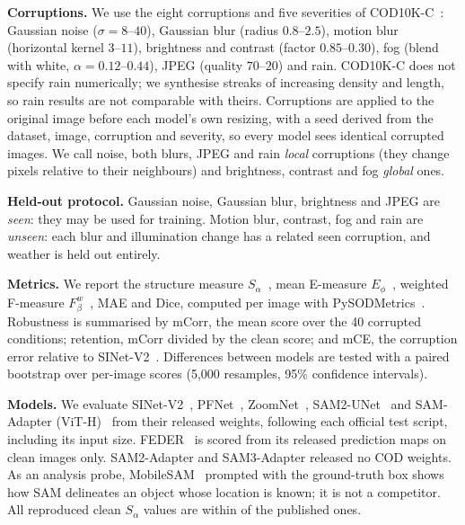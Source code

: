 \documentclass[conference]{IEEEtran}
\newcommand{\Sa}{$S_\alpha$}
\begin{document}
\textbf{Corruptions.} We use the eight corruptions and five severities of COD10K-C~\cite{sayem2026cod10kc}: Gaussian noise ($\sigma=8$--$40$), Gaussian blur (radius $0.8$--$2.5$), motion blur (horizontal kernel $3$--$11$), brightness and contrast (factor $0.85$--$0.30$), fog (blend with white, $\alpha=0.12$--$0.44$), JPEG (quality $70$--$20$) and rain. COD10K-C does not specify rain numerically; we synthesise streaks of increasing density and length, so rain results are not comparable with theirs. Corruptions are applied to the original image before each model's own resizing, with a seed derived from the dataset, image, corruption and severity, so every model sees identical corrupted images. We call noise, both blurs, JPEG and rain \emph{local} corruptions (they change pixels relative to their neighbours) and brightness, contrast and fog \emph{global} ones.

\textbf{Held-out protocol.} Gaussian noise, Gaussian blur, brightness and JPEG are \emph{seen}: they may be used for training. Motion blur, contrast, fog and rain are \emph{unseen}: each blur and illumination change has a related seen corruption, and weather is held out entirely.

\textbf{Metrics.} We report the structure measure \Sa~\cite{fan2017smeasure}, mean E-measure $E_\phi$~\cite{fan2018emeasure}, weighted F-measure $F_\beta^w$~\cite{margolin2014wfm}, MAE and Dice, computed per image with PySODMetrics~\cite{pysodmetrics}. Robustness is summarised by mCorr, the mean score over the 40 corrupted conditions; retention, mCorr divided by the clean score; and mCE, the corruption error relative to SINet-V2~\cite{hendrycks2019imagenetc}. Differences between models are tested with a paired bootstrap over per-image scores (5{,}000 resamples, 95\% confidence intervals).

\textbf{Models.} We evaluate SINet-V2~\cite{fan2022sinetv2}, PFNet~\cite{mei2021pfnet}, ZoomNet~\cite{pang2022zoomnet}, SAM2-UNet~\cite{xiong2024sam2unet} and SAM-Adapter (ViT-H)~\cite{chen2023samadapter} from their released weights, following each official test script, including its input size. FEDER~\cite{he2023feder} is scored from its released prediction maps on clean images only. SAM2-Adapter and SAM3-Adapter released no COD weights. As an analysis probe, MobileSAM~\cite{zhang2023mobilesam} prompted with the ground-truth box shows how SAM delineates an object whose location is known; it is not a competitor. All reproduced clean \Sa{} values are within \NReproMaxDelta{} of the published ones.
\end{document}
